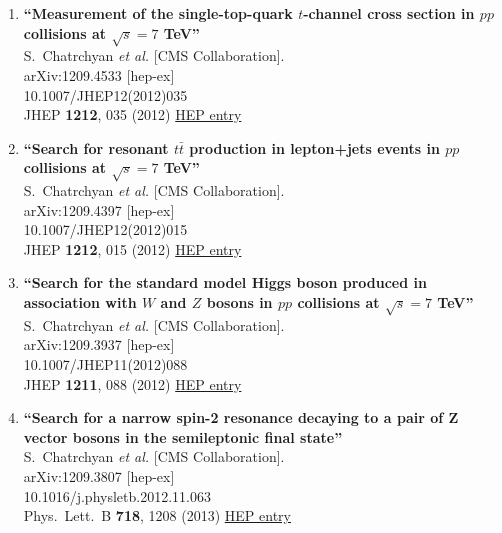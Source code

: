 \documentclass{article}
\begin{document}
\begin{enumerate}
\item%
{\bf ``Measurement of the single-top-quark $t$-channel cross section in $pp$ collisions at $\sqrt{s}=7$ TeV''}
  \\{}S.~Chatrchyan {\it et al.} [CMS Collaboration].
  \\{}arXiv:1209.4533 [hep-ex]
    \\{}10.1007/JHEP12(2012)035
\\{}JHEP {\bf 1212}, 035 (2012) %
\href{http://inspirehep.net/record/1186734}{HEP entry}


\item%
{\bf ``Search for resonant $t\bar{t}$ production in lepton+jets events in $pp$ collisions at $\sqrt{s}=7$ TeV''}
  \\{}S.~Chatrchyan {\it et al.} [CMS Collaboration].
  \\{}arXiv:1209.4397 [hep-ex]
    \\{}10.1007/JHEP12(2012)015
\\{}JHEP {\bf 1212}, 015 (2012) %
\href{http://inspirehep.net/record/1186730}{HEP entry}


\item%
{\bf ``Search for the standard model Higgs boson produced in association with $W$ and $Z$ bosons in $pp$ collisions at $\sqrt{s}=7$ TeV''}
  \\{}S.~Chatrchyan {\it et al.} [CMS Collaboration].
  \\{}arXiv:1209.3937 [hep-ex]
    \\{}10.1007/JHEP11(2012)088
\\{}JHEP {\bf 1211}, 088 (2012) %
\href{http://inspirehep.net/record/1186385}{HEP entry}


\item%
{\bf ``Search for a narrow spin-2 resonance decaying to a pair of Z vector bosons in the semileptonic final state''}
  \\{}S.~Chatrchyan {\it et al.} [CMS Collaboration].
  \\{}arXiv:1209.3807 [hep-ex]
    \\{}10.1016/j.physletb.2012.11.063
\\{}Phys.\ Lett.\ B {\bf 718}, 1208 (2013) %
\href{http://inspirehep.net/record/1186381}{HEP entry}



\end{enumerate}
\end{document}
